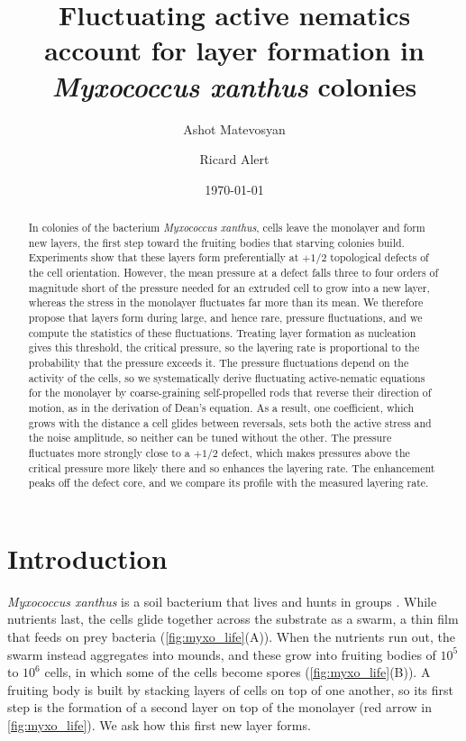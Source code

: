 \documentclass[aps,pre,reprint,superscriptaddress,longbibliography,nofootinbib
]{revtex4-2}
\begin{document}
\title{Fluctuating active nematics account for layer formation in \textit{Myxococcus xanthus} colonies}

\author{Ashot Matevosyan}
\author{Ricard Alert}

\date{\today}

\begin{abstract}
In colonies of the bacterium \textit{Myxococcus xanthus},
cells leave the monolayer and form new layers, the first
step toward the fruiting bodies that starving colonies
build. Experiments show that these layers form
preferentially at $+1/2$ topological defects of the cell
orientation. However, the mean pressure at a defect falls
three to four orders of magnitude short of the pressure
needed for an extruded cell to grow into a new layer,
whereas the stress in the monolayer fluctuates far more
than its mean. We therefore propose that layers form during
large, and hence rare, pressure fluctuations, and we
compute the statistics of these fluctuations. Treating
layer formation as nucleation gives this threshold, the
critical pressure, so the layering rate is proportional to
the probability that the pressure exceeds it. The pressure
fluctuations depend on the activity of the cells, so we
systematically derive fluctuating active-nematic equations
for the monolayer by coarse-graining self-propelled rods
that reverse their direction of motion, as in the
derivation of Dean's equation. As a result, one
coefficient, which grows with the distance a cell glides
between reversals, sets both the active stress and the
noise amplitude, so neither can be tuned without the other.
The pressure fluctuates more strongly close to a $+1/2$
defect, which makes pressures above the critical pressure
more likely there and so enhances the layering rate. The
enhancement peaks off the defect core, and we compare its
profile with the measured layering rate.
\end{abstract}

\maketitle

\tableofcontents

\section{Introduction}
\label{sec:intro}
\textit{Myxococcus xanthus} is a soil bacterium that lives
and hunts in groups \cite{munoz2016}. While nutrients last,
the cells glide together across the substrate as a swarm, a
thin film that feeds on prey bacteria
(\cref{fig:myxo_life}(A)). When the nutrients run out, the
swarm instead aggregates into mounds, and these grow into
fruiting bodies of $10^5$ to $10^6$ cells, in which some of
the cells become spores (\cref{fig:myxo_life}(B)). A
fruiting body is built by stacking layers of cells on top
of one another, so its first step is the formation of a
second layer on top of the monolayer (red arrow in
\cref{fig:myxo_life}). We ask how this first new layer
forms.
\end{document}
